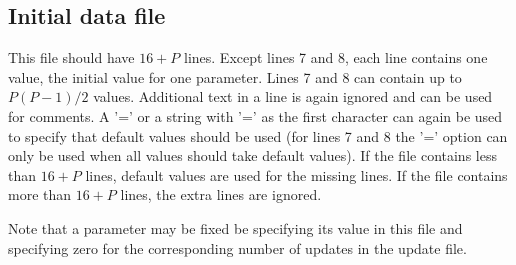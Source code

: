 \documentclass[11pt]{article}
\begin{document}
\subsection{\label{initial}Initial data file}
This file should have $16+P$ lines. Except lines 7 and 8, each line contains one value, 
the initial value for one parameter. Lines 7 and 8 can contain up to $P(P-1)/2$ values.
Additional text in a line is again ignored and can be used for comments. A '=' or a
string with '=' as the first character can again be used to specify that default values
should be used (for lines 7 and 8 the '=' option can only be used when all values should
take default values). If the file contains less than $16+P$ lines,
default values are used for the missing lines. If the file contains more than 
$16+P$ lines, the extra lines are ignored.

Note that a parameter may be fixed be specifying its value in this file and 
specifying zero for the corresponding number of updates in the update file.
\end{document}
